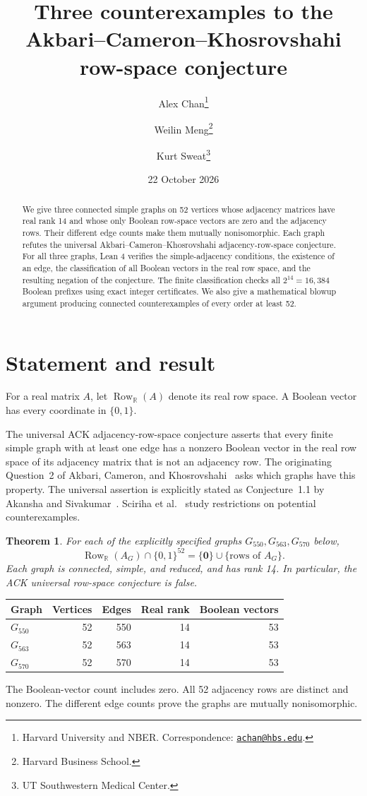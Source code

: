 \documentclass[11pt]{article}
\title{Three counterexamples to the
Akbari--Cameron--Khosrovshahi row-space conjecture}
\author{
Alex Chan\thanks{Harvard University and NBER.
Correspondence:
\href{mailto:achan@hbs.edu}{\texttt{achan@hbs.edu}}.}
\and
Weilin Meng\thanks{Harvard Business School.}
\and
Kurt Sweat\thanks{UT Southwestern Medical Center.}
}
\date{22 October 2026}
\newtheorem{theorem}{Theorem}
\begin{document}
\maketitle
\begin{abstract}
We give three connected simple graphs on 52 vertices whose adjacency
matrices have real rank 14 and whose only Boolean row-space vectors
are zero and the adjacency rows. Their different edge counts make
them mutually nonisomorphic. Each graph refutes the universal
Akbari--Cameron--Khosrovshahi adjacency-row-space conjecture.
For all three graphs, Lean 4 verifies the simple-adjacency conditions,
the existence of an edge, the classification of all Boolean vectors
in the real row space, and the resulting negation of the conjecture.
The finite classification checks all $2^{14}=16,384$ Boolean prefixes
using exact integer certificates. We also give a mathematical
blowup argument producing connected counterexamples of every order
at least 52.
\end{abstract}
\section*{Statement and result}
For a real matrix $A$, let $\operatorname{Row}_{\mathbb R}(A)$
denote its real row space. A Boolean vector has every coordinate
in $\{0,1\}$.

The universal ACK adjacency-row-space conjecture asserts that every
finite simple graph with at least one edge has a nonzero Boolean
vector in the real row space of its adjacency matrix that is not
an adjacency row. The originating Question~2 of
Akbari, Cameron, and Khosrovshahi~\cite{ack} asks which graphs
have this property. The universal assertion is explicitly stated
as Conjecture~1.1 by Akansha and Sivakumar~\cite{akansha}.
Sciriha et al.~\cite{sciriha} study restrictions on potential
counterexamples.
\begin{theorem}
For each of the explicitly specified graphs $G_{550},G_{563},G_{570}$ below,
\[
\operatorname{Row}_{\mathbb R}(A_G)\cap\{0,1\}^{52}
=\{\mathbf 0\}\cup\{\text{rows of }A_G\}.
\]
Each graph is connected, simple, and reduced, and has rank 14. In particular, the ACK universal row-space conjecture is false.
\end{theorem}
\begin{center}
\begin{tabular}{lrrrr}
\toprule
Graph & Vertices & Edges & Real rank & Boolean vectors\\
\midrule
$G_{550}$ & 52 & 550 & 14 & 53\\
$G_{563}$ & 52 & 563 & 14 & 53\\
$G_{570}$ & 52 & 570 & 14 & 53\\
\bottomrule
\end{tabular}
\end{center}
The Boolean-vector count includes zero. All 52 adjacency rows are distinct and nonzero. The different edge counts prove the graphs are mutually nonisomorphic.
\end{document}
